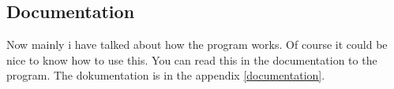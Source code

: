 \subsection{Documentation}
Now mainly i have talked about how the program works. Of course it could be nice to know how to use this. You can read this in the documentation to the program. The dokumentation is in the appendix \ref{documentation}.
\begin{comment}
This section serves as a documentation for a user of the program. For now the program can build with random walk polymers and rods.  
    \subsection{Installation}
    Since i haven't implemented a make file the user have to install ginac and compile the program self. For installing ginac see (\url{https://www.ginac.de/tutorial/#Installation}). After installing ginac clone the program through the github repository with:
    \begin{center}
        \url{https://github.com/Tobionecenobi/Scattering-equation-builder.git}.        
    \end{center}
    Build your structure in the main.cpp (how to do this is explained below). In your terminal open the github repository, file and run the compilation. In linux bash terminal compilation can be done using the gnu c++ compiler by running:
    \begin{lstlisting}
$g++ main.cpp Structure.cpp SymbolInterface.cpp -o scatteringFunctions -lginac
    \end{lstlisting}
    Now you can run the program. In the linux bash terminal this can be runned by:
        \begin{lstlisting}
$./scatteringFunctions
        \end{lstlisting}

    

 \subsection{How to write a structure in main.cpp}
    To build a structure of equally random walk polymer (meaining they all have the same $R_g$) joined together and print out the form factor of the structure in latex format:\\
    \begin{lstlisting}[frame = single]
    #include "Structure.hpp"
    #include "RWPolymer.hpp"
    #include "GeneralSubUnit.hpp"
    #include "Struct2Sub.hpp"
    #include "Rod.hpp"


\end{comment}
